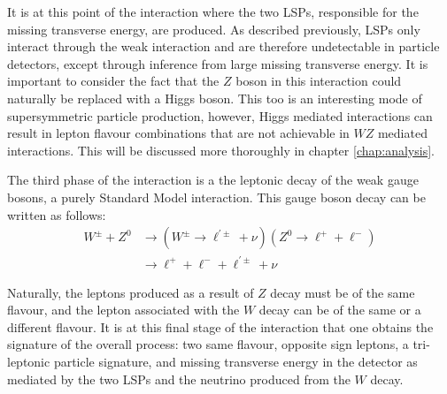 \noindent It is at this point of the interaction where the two LSPs, responsible for the missing transverse energy, are produced. 
As described previously, LSPs only interact through the weak interaction and are therefore undetectable in particle detectors, except through inference from large missing transverse energy.
It is important to consider the fact that the $Z$ boson in this interaction could naturally be replaced with a Higgs boson.
This too is an interesting mode of supersymmetric particle production, however, Higgs mediated interactions can result in lepton flavour combinations that are not achievable in $WZ$ mediated interactions.
This will be discussed more thoroughly in chapter \ref{chap:analysis}.

The third phase of the interaction is a the leptonic decay of the weak gauge bosons, a purely Standard Model interaction.
This gauge boson decay can be written as follows:
\begin{align}
W^{\pm} + Z^{0} &\rightarrow (W^{\pm} \rightarrow \ell^{\prime \pm} + \nu) (Z^{0} \rightarrow \ell^{+} + \ell^{-}) \\
& \rightarrow \ell^{+} + \ell^{-} + \ell^{\prime \pm} + \nu
\end{align}

\noindent Naturally, the leptons produced as a result of $Z$ decay must be of the same flavour, and the lepton associated with the $W$ decay can be of the same or a different flavour.
It is at this final stage of the interaction that one obtains the signature of the overall process: two same flavour, opposite sign leptons, a tri-leptonic particle signature, and missing transverse energy in the detector as mediated by the two LSPs and the neutrino produced from the $W$ decay.